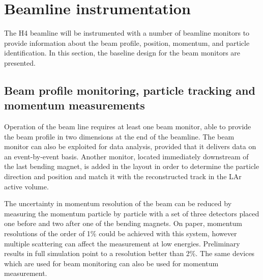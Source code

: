 \section{Beamline instrumentation}
\label{sec:beaminstruments}

The H4 beamline will be instrumented with a number of beamline monitors to provide information 
 about the beam profile, position, momentum, and particle identification. 
 In this section, the baseline design for the beam monitors are presented. 

\subsection{Beam profile monitoring, particle tracking and momentum measurements}
Operation of the beam line requires at least one beam  monitor, able to provide the beam profile in two dimensions at the end of the beamline.   The beam monitor can also be exploited for data analysis, provided that it delivers data on an event-by-event basis. Another monitor, located immediately downstream of the last bending magnet, is added in the layout  in order to determine the particle  direction and position and match it with the reconstructed track in the LAr active volume.

The uncertainty in momentum resolution of the beam can be reduced by measuring the momentum particle by particle with a set of three detectors placed one before and two after one of the bending magnets. On paper, momentum resolutions of the order of 1\% could be achieved with this system, however  multiple scattering can affect the measurement at low energies. 
Preliminary results in full simulation point to a resolution better than 2\%. The same devices which are used for beam monitoring can also be used for momentum measurement.
%
